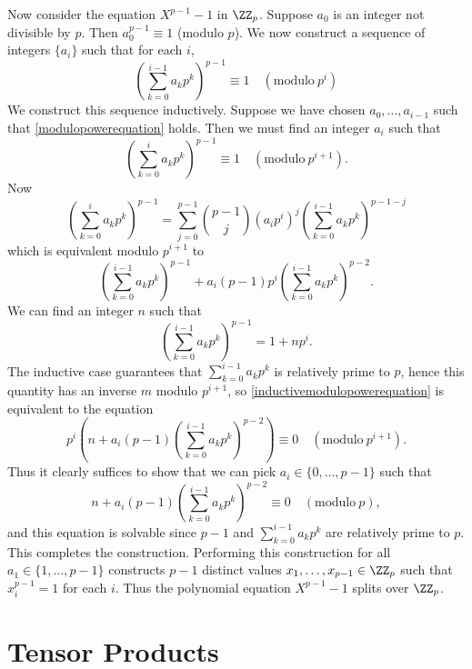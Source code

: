 \begin{example}
    Now consider the equation $X^{p-1} - 1$ in $\ZZ_p$. Suppose $a_0$ is an integer not divisible by $p$. Then $a_0^{p-1} \equiv 1$ (modulo $p$). We now construct a sequence of integers $\{ a_i \}$ such that for each $i$,
    \begin{equation} \label{modulopowerequation}
        \left( \sum_{k = 0}^{i-1} a_k p^k \right)^{p-1} \equiv 1 \quad(\text{modulo}\ p^i)
    \end{equation}
    We construct this sequence inductively. Suppose we have chosen $a_0,\dots, a_{i-1}$ such that \eqref{modulopowerequation} holds. Then we must find an integer $a_i$ such that
    \begin{equation} \label{inductivemodulopowerequation}
        \left( \sum_{k = 0}^i a_k p^k \right)^{p-1} \equiv 1 \quad(\text{modulo}\ p^{i+1}).
    \end{equation}
    Now
    \[ \left( \sum_{k = 0}^i a_k p^k \right)^{p-1} = \sum_{j = 0}^{p-1} \binom{p-1}{j} \left( a_ip^i \right)^j \left( \sum_{k = 0}^{i-1} a_k p^k \right)^{p-1-j} \]
    which is equivalent modulo $p^{i+1}$ to
    \[ \left( \sum_{k = 0}^{i-1} a_k p^k \right)^{p-1} + a_i (p-1)p^i \left( \sum_{k = 0}^{i-1} a_k p^k \right)^{p-2}. \]
    We can find an integer $n$ such that
    \[ \left( \sum_{k = 0}^{i-1} a_k p^k \right)^{p-1} = 1 + np^i. \]
    The inductive case guarantees that $\sum_{k = 0}^{i-1} a_k p^k$ is relatively prime to $p$, hence this quantity has an inverse $m$ modulo $p^{i+1}$, so \eqref{inductivemodulopowerequation} is equivalent to the equation
    \[ p^i \left(n + a_i (p-1) \left( \sum_{k = 0}^{i-1} a_k p^k \right)^{p-2} \right) \equiv 0 \quad(\text{modulo}\ p^{i+1}). \]
    Thus it clearly suffices to show that we can pick $a_i \in \{ 0, \dots, p-1 \}$ such that
    \[ n + a_i (p-1) \left( \sum_{k = 0}^{i-1} a_k p^k \right)^{p-2} \equiv 0 \quad(\text{modulo}\ p), \]
    and this equation is solvable since $p-1$ and $\sum_{k = 0}^{i-1} a_k p^k$ are relatively prime to $p$. This completes the construction. Performing this construction for all $a_1 \in \{ 1, \dots, p-1 \}$ constructs $p-1$ distinct values $x_1, \dots, x_{p-1} \in \ZZ_p$ such that $x_i^{p-1} = 1$ for each $i$. Thus the polynomial equation $X^{p-1} - 1$ splits over $\ZZ_p$.
\end{example}

\section{Tensor Products}

